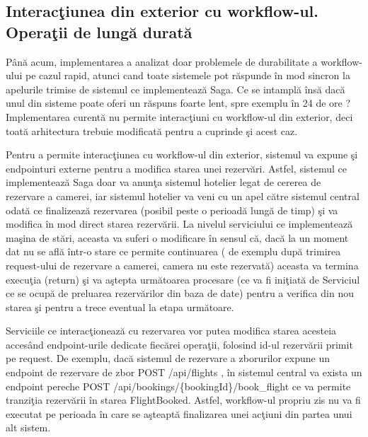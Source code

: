 \subsection{Interacţiunea din exterior cu workflow-ul. Operaţii de lungă durată}
\par Până acum, implementarea a analizat doar problemele de durabilitate a workflow-ului pe cazul rapid, atunci cand toate sistemele pot răspunde în mod sincron la apelurile trimise de sistemul ce implementează Saga. Ce se intamplă însă dacă unul din sisteme poate oferi un răspuns foarte lent, spre exemplu în 24 de ore ? Implementarea curentă nu permite interacţiuni cu workflow-ul din exterior, deci toată arhitectura trebuie modificată pentru a cuprinde şi acest caz. 
\par Pentru a permite interacţiunea cu workflow-ul din exterior, sistemul va expune şi endpointuri externe pentru a modifica starea unei rezervări. Astfel, sistemul ce implementează Saga doar va anunţa sistemul hotelier legat de cererea de rezervare a camerei, iar sistemul hotelier va veni cu un apel către sistemul central odată ce finalizează rezervarea (posibil peste o perioadă lungă de timp) şi va modifica în mod direct starea rezervării. La nivelul serviciului ce implementează maşina de stări, aceasta va suferi o modificare în sensul că, dacă la un moment dat nu se află într-o stare ce permite continuarea ( de exemplu după trimirea request-ului de rezervare a camerei, camera nu este rezervată) aceasta va termina execuţia (return) şi va aştepta următoarea procesare (ce va fi iniţiată de Serviciul ce se ocupă de preluarea rezervărilor din baza de date) pentru a verifica din nou starea şi pentru a trece eventual la etapa următoare. 
\par Serviciile ce interacţionează cu rezervarea vor putea modifica starea acesteia accesând endpoint-urile dedicate fiecărei operaţii, folosind id-ul rezervării primit pe request. De exemplu, dacă sistemul de rezervare a zborurilor expune un endpoint de rezervare de zbor POST \slash api\slash flights , în sistemul central va exista un endpoint pereche POST \slash api\slash bookings\slash \{bookingId\}\slash book\_flight ce va permite tranziţia rezervării în starea FlightBooked. Astfel, workflow-ul propriu zis nu va fi executat pe perioada în care se aşteaptă finalizarea unei acţiuni din partea unui alt sistem. 
